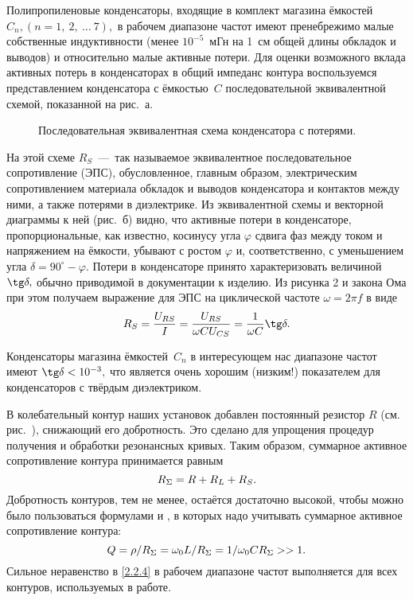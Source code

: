Полипропиленовые конденсаторы, входящие в комплект магазина ёмкостей
$C_n,(n=1,~2,~\ldots~7),$ в рабочем диапазоне частот имеют пренебрежимо малые
собственные индуктивности (менее $10^{-5}$~мГн на 1~см общей длины обкладок и
выводов) и относительно малые активные потери. Для оценки возможного вклада
активных потерь в конденсаторах в общий импеданс контура воспользуемся
представлением конденсатора с ёмкостью~$C$ последовательной эквивалентной
схемой, показанной на рис.~а.
\begin{figure}[h!]
	\caption{Последовательная эквивалентная схема конденсатора с потерями.}
\end{figure}
На этой схеме $R_S$~---~так называемое эквивалентное последовательное
сопротивление (ЭПС), обусловленное, главным образом, электрическим
сопротивлением материала обкладок и выводов конденсатора и контактов между ними,
а также потерями в диэлектрике. Из эквивалентной схемы и векторной диаграммы к
ней (рис.~б) видно, что активные потери в конденсаторе,
пропорциональные, как известно, косинусу угла $\varphi$ сдвига фаз между током и
напряжением на ёмкости, убывают с ростом $\varphi$ и, соответственно, с
уменьшением угла $\delta=90^{\circ}-\varphi.$ Потери в конденсаторе принято
характеризовать величиной $\tg\delta,$ обычно приводимой в документации к
изделию. Из рисунка 2 и закона Ома при этом получаем выражение для ЭПС на
циклической частоте $\omega=2\pi f$ в виде
\begin{equation}\eqmark{2.2.1}
R_S=\dfrac{U_{RS}}{I}=\dfrac{U_{RS}}{\omega CU_{CS}}=\dfrac{1}{\omega C}\tg\delta.
\end{equation}

Конденсаторы магазина ёмкостей~$C_n$ в интересующем нас диапазоне частот имеют
$\tg\delta<10^{-3},$ что является очень хорошим (низким!) показателем для
конденсаторов с твёрдым диэлектриком.

В колебательный контур наших установок добавлен постоянный резистор $R$ (см.
рис.~), снижающий его добротность. Это сделано для упрощения
процедур получения и обработки резонансных кривых. Таким образом, суммарное
активное сопротивление контура принимается равным
\begin{equation}\eqmark{2.2.2}
	R_{\Sigma}=R+R_L+R_S.
\end{equation}
Добротность контуров, тем не менее, остаётся достаточно высокой, чтобы можно
было пользоваться формулами  и , в которых
надо учитывать суммарное активное сопротивление контура:
\begin{equation}\eqmark{2.2.3}
	Q=\rho/R_{\Sigma}=\omega_0L/R_{\Sigma}=1/\omega_0CR_{\Sigma}>>1.
\end{equation}
Сильное неравенство в \eqref{2.2.4} в рабочем диапазоне частот выполняется для
всех контуров, используемых в работе.

